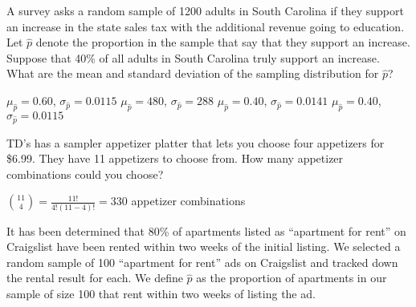 \documentclass[noanswers]{exam}
\begin{document}
\begin{questions}
\question A survey asks a random sample of 1200 adults in South Carolina if they support an increase in the state sales tax with the additional revenue going to education. Let $\hat{p}$ denote the proportion in the sample that say that they support an increase. Suppose that 40\% of all adults in South Carolina truly support an increase. What are the mean and standard deviation of the sampling distribution for $\hat{p}$?

\vspace{3mm}

\begin{choices}
\choice $\mu_{\hat{p}}=0.60$, $\sigma_{\hat{p}}=0.0115$
\choice $\mu_{\hat{p}}=480$, $\sigma_{\hat{p}}=288$
\CorrectChoice $\mu_{\hat{p}}=0.40$, $\sigma_{\hat{p}}=0.0141$
\choice $\mu_{\hat{p}}=0.40$, $\sigma_{\hat{p}}=0.0115$
\end{choices}

\vspace{3mm} 

\question TD's has a sampler appetizer platter that lets you choose four appetizers for \$6.99. They have 11 appetizers to choose from. How many appetizer combinations could you choose?

\begin{solution}[\stretch{1}]
${11\choose 4}=\frac{11!}{4!(11-4)!}=330$ appetizer combinations
\end{solution}

\newpage 

\question It has been determined that 80\% of apartments listed as ``apartment for rent'' on Craigslist have been rented within two weeks of the initial listing. We selected a random sample of 100 ``apartment for rent'' ads on Craigslist and tracked down the rental result for each. We define $\hat{p}$ as the proportion of apartments in our sample of size 100 that rent within two weeks of listing the ad.

\vspace{3mm}

\end{questions}
\end{document}
